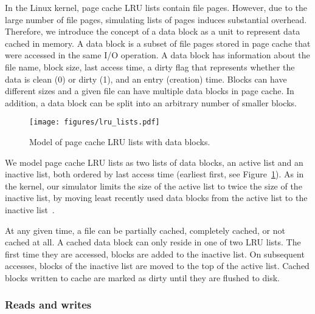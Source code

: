 \documentclass[conference]{IEEEtran}
\begin{document}
    In the Linux kernel, page cache LRU lists contain file pages. However,
    due to the large number of file pages, simulating lists of pages
    induces substantial overhead.
    Therefore, we introduce the concept of a data block as a unit to represent data
    cached in memory. A data block is a subset of file pages stored in
    page cache that were accessed in the same I/O operation.
    A data block has information about the file name, block size, last access
    time, a dirty flag that represents whether the data is clean (0)
    or dirty (1), and an entry (creation) time.
    Blocks can have different sizes and a given file can have multiple
    data blocks in page cache. In addition, a data block can be split into an
    arbitrary number of smaller blocks.
    \begin{figure}
           \centering
           \texttt{[image: figures/lru\_lists.pdf]}
           \caption{Model of page cache LRU lists with data blocks.}
           \label{fig:lrulist}
    \end{figure}

    We model page cache LRU lists as
    two lists of data blocks, an active list and an inactive list, both ordered by
    last access time (earliest first, see Figure~\ref{fig:lrulist}).
    As in the kernel, our simulator limits the size of the active list to
    twice the size of the inactive list, by moving least recently
    used data blocks from the active list to the inactive list~\cite{gorman2004understanding, linuxdev3rd2010}.

    At any given time, a file can be partially cached, completely cached,
    or not cached at all. A cached data block can only reside in one of two
    LRU lists. The first time they are accessed, blocks are
    added to the inactive list. On subsequent accesses, blocks of the
    inactive list are moved to the top of the active list. Cached blocks
    written to cache are marked as dirty until they are flushed to disk.

    \subsubsection{Reads and writes}
\end{document}
